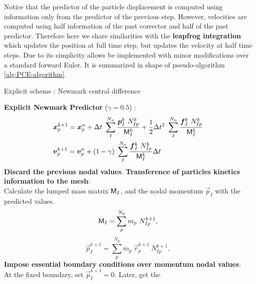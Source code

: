 Notice that the predictor of the particle displacement is
computed using information only from the predictor of the
previous step. However, velocities are computed using half information
of the past corrector and half of the past predictor. Therefore here we share
similarities with the \textbf{leapfrog integration} which updates the
position at full time step, but updates the velocity at half time
steps. Due to its simplicity allows be implemented with minor modifications
over a standard forward Euler. It is summarized in shape of
pseudo-algorithm \ref{alg:PCE-algorithm}.

\begin{algorithm}
\renewcommand{\thealgorithm}{}
\caption{Explicit scheme : Newmark central difference}
\label{alg:Second_step_MPM_2STG}
\begin{algorithmic}[1]
  \STATE \textbf{Explicit Newmark Predictor} ($\gamma = 0.5$) :
  \begin{align*}
    &\vec{x}_p^{k+1} = \vec{x}_p^n + \Delta t\ \sum^{N_n}_{I}\frac{\vec{p}_{I}^{k}\ N_{Ip}^k}{\tens{M}_I^k} + \frac{1}{2}\Delta t^2\ \sum^{N_n}_{I}\frac{\vec{f}_{I}^{k}\ N_{Ip}^k}{\tens{M}_I^k}\\
    &\vec{v}_p^{k+1} = \vec{v}_p^n + (1 - \gamma)\  \sum^{N_n}_{I}\frac{\vec{f}_{I}^{k}\ N_{Ip}^k}{\tens{M}_I^k}\Delta t        
  \end{align*}
  \STATE \textbf{Discard the previous nodal values}.
  \STATE \textbf{Transference of particles kinetics information to the
    mesh}:\\
  Calculate the lumped mass matrix $\mathsf{M}_{I}$,
  and the nodal momentum $\vec{p}_{I}$ with the predicted values.
  \begin{equation*}
    \mathsf{M}_{I} = \sum_{p}^{N_p} m_p\ N_{Ip}^{k+1},
  \end{equation*}
  \begin{equation*}
    \vec{p}_{I}^{k+1} = \sum_{p}^{N_p} m_p\ \vec{v}_{p}^{k+1}\ N_{Ip}^{k+1},
  \end{equation*}
  \STATE \textbf{Impose essential boundary conditions over momentum nodal
    values}:\\
  At the fixed boundary, set $\vec{p}_{I}^{k+1} = 0$. Later, get the

\end{algorithmic}
\end{algorithm}
